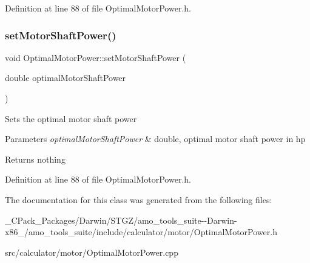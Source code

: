 Definition at line 88 of file Optimal\+Motor\+Power.\+h.

\mbox{\label{class_optimal_motor_power_ada8a9e3caac34c54470ad13ffe7edf53}} 
\subsubsection{\texorpdfstring{set\+Motor\+Shaft\+Power()}{setMotorShaftPower()}\hspace{0.1cm}{\footnotesize\ttfamily [3/3]}}
{\footnotesize\ttfamily void Optimal\+Motor\+Power\+::set\+Motor\+Shaft\+Power (\begin{DoxyParamCaption}\item[{double}]{optimal\+Motor\+Shaft\+Power }\end{DoxyParamCaption})\hspace{0.3cm}{\ttfamily [inline]}}

Sets the optimal motor shaft power


\begin{DoxyParams}{Parameters}
{\em optimal\+Motor\+Shaft\+Power} & double, optimal motor shaft power in hp\\
\hline
\end{DoxyParams}
\begin{DoxyReturn}{Returns}
nothing 
\end{DoxyReturn}


Definition at line 88 of file Optimal\+Motor\+Power.\+h.



The documentation for this class was generated from the following files\+:\begin{DoxyCompactItemize}
\item 
\+\_\+\+C\+Pack\+\_\+\+Packages/\+Darwin/\+S\+T\+G\+Z/amo\+\_\+tools\+\_\+suite-\/-\/\+Darwin-\/x86\+\_/amo\+\_\+tools\+\_\+suite/include/calculator/motor/Optimal\+Motor\+Power.\+h\item 
src/calculator/motor/Optimal\+Motor\+Power.\+cpp\end{DoxyCompactItemize}
